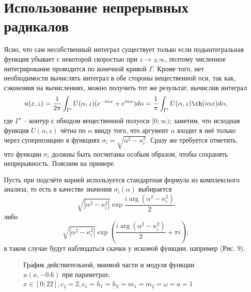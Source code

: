 \documentclass[a4paper, 12pt]{article}
\begin{document}
\section{Использование непрерывных радикалов}
Ясно, что сам несобственный интеграл существует только если подынтегральная функция убывает с некоторой скоростью при $z\rightarrow \pm \infty$, поэтому численное интегрирование проводится по конечной кривой $\Gamma$. Кроме того, нет необходимости вычислять интеграл в обе стороны вещественной оси, так как, сэкономив на вычислениях, можно получить тот же результат, вычислив интеграл
$$u(x,z) =\frac{1}{2\pi} \int_{\Gamma'} U(\alpha, z) (e^{-i \alpha x}+e^{i \alpha x}) d\alpha=\frac{1}{\pi}\int_{\Gamma'} U(\alpha, z) \ch (i \alpha x) d\alpha,$$
где $\Gamma'$ -- контур с обходом вещественной полуоси $[0;\infty)$; заметим, что исходная функция $U(\alpha,z)$ чётна по $\alpha$ ввиду того, что аргумент $\alpha$ входит в неё только через суперпозицию в функциях $\sigma_i = \sqrt{\alpha^2-\kappa^2_i}$. Сразу же требуется отметить, что функции $\sigma_i$ должны быть посчитаны особым образом, чтобы сохранять непрерывность. Поясним на примере.

Пусть при подсчёте корней используется стандартная формула из комплексного анализа, то есть в качестве значения $\sigma_i(\alpha)$ выбирается 
$$\sqrt{|\alpha^2-\kappa^2_i|}\exp{\dfrac{i \arg (\alpha^2-\kappa^2_i)}{2}}$$ 
либо
$$\sqrt{|\alpha^2-\kappa^2_i|}\exp\left({\dfrac{i \arg (\alpha^2-\kappa^2_i)}{2}+\pi i}\right);$$
в таком случае будут наблюдаться скачки у искомой функции, например (Рис. 9).
\begin{figure}[h!]
\noindent{}
\caption{График действительной, мнимой части и модуля функции $u(x,-0.6)$ при параметрах: $x \in [0;22], c_2=2, c_1=h_1=h_2=m_1=m_2=\omega=a=1$}
\label{figCurves}
\end{figure}
\end{document}

